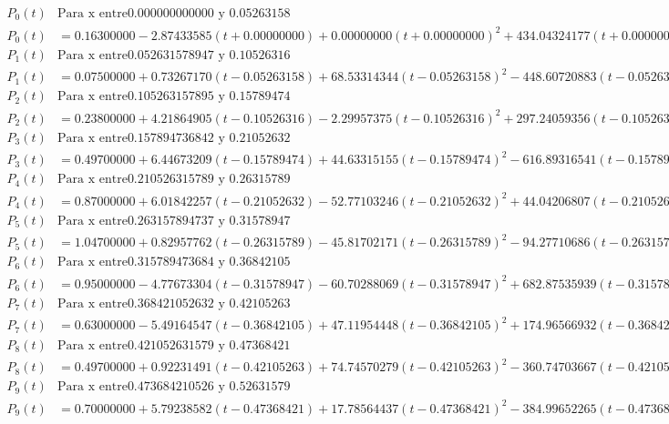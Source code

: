 \begin{align*}
P_0(t) & \text{Para x entre} 0.000000000000 \text{ y } 0.05263158 \\
P_0(t) & = 0.16300000-2.87433585(t+0.00000000)+0.00000000(t+0.00000000)^2+434.04324177(t+0.00000000)^3 \\
P_1(t) & \text{Para x entre} 0.052631578947 \text{ y } 0.10526316 \\
P_1(t) & = 0.07500000+0.73267170(t-0.05263158)+68.53314344(t-0.05263158)^2-448.60720883(t-0.05263158)^3 \\
P_2(t) & \text{Para x entre} 0.105263157895 \text{ y } 0.15789474 \\
P_2(t) & = 0.23800000+4.21864905(t-0.10526316)-2.29957375(t-0.10526316)^2+297.24059356(t-0.10526316)^3 \\
P_3(t) & \text{Para x entre} 0.157894736842 \text{ y } 0.21052632 \\
P_3(t) & = 0.49700000+6.44673209(t-0.15789474)+44.63315155(t-0.15789474)^2-616.89316541(t-0.15789474)^3 \\
P_4(t) & \text{Para x entre} 0.210526315789 \text{ y } 0.26315789 \\
P_4(t) & = 0.87000000+6.01842257(t-0.21052632)-52.77103246(t-0.21052632)^2+44.04206807(t-0.21052632)^3 \\
P_5(t) & \text{Para x entre} 0.263157894737 \text{ y } 0.31578947 \\
P_5(t) & = 1.04700000+0.82957762(t-0.26315789)-45.81702171(t-0.26315789)^2-94.27710686(t-0.26315789)^3 \\
P_6(t) & \text{Para x entre} 0.315789473684 \text{ y } 0.36842105 \\
P_6(t) & = 0.95000000-4.77673304(t-0.31578947)-60.70288069(t-0.31578947)^2+682.87535939(t-0.31578947)^3 \\
P_7(t) & \text{Para x entre} 0.368421052632 \text{ y } 0.42105263 \\
P_7(t) & = 0.63000000-5.49164547(t-0.36842105)+47.11954448(t-0.36842105)^2+174.96566932(t-0.36842105)^3 \\
P_8(t) & \text{Para x entre} 0.421052631579 \text{ y } 0.47368421 \\
P_8(t) & = 0.49700000+0.92231491(t-0.42105263)+74.74570279(t-0.42105263)^2-360.74703667(t-0.42105263)^3 \\
P_9(t) & \text{Para x entre} 0.473684210526 \text{ y } 0.52631579 \\
P_9(t) & = 0.70000000+5.79238582(t-0.47368421)+17.78564437(t-0.47368421)^2-384.99652265(t-0.47368421)^3 \\

\end{align*}

